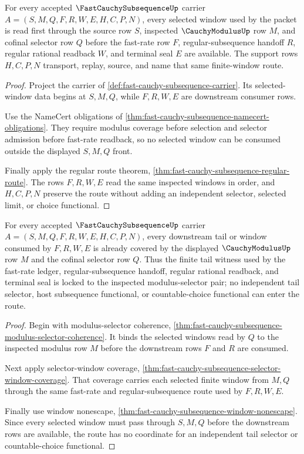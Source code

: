 \begin{theorem}
\label{thm:fast-cauchy-subsequence-window-nonescape}
For every accepted $\FastCauchySubsequenceUp$ carrier $A=(S,M,Q,F,R,W,E,H,C,P,N)$, every selected window used by the packet is read first through the source row $S$, inspected $\CauchyModulusUp$ row $M$, and cofinal selector row $Q$ before the fast-rate row $F$, regular-subsequence handoff $R$, regular rational readback $W$, and terminal seal $E$ are available. The support rows $H,C,P,N$ transport, replay, source, and name that same finite-window route.
\end{theorem}
\begin{proof}
Project the carrier of \autoref{def:fast-cauchy-subsequence-carrier}. Its selected-window data begins at $S,M,Q$, while $F,R,W,E$ are downstream consumer rows.

Use the NameCert obligations of \autoref{thm:fast-cauchy-subsequence-namecert-obligations}. They require modulus coverage before selection and selector admission before fast-rate readback, so no selected window can be consumed outside the displayed $S,M,Q$ front.

Finally apply the regular route theorem, \autoref{thm:fast-cauchy-subsequence-regular-route}. The rows $F,R,W,E$ read the same inspected windows in order, and $H,C,P,N$ preserve the route without adding an independent selector, selected limit, or choice functional.
\end{proof}

\begin{theorem}
\label{thm:fast-cauchy-subsequence-tail-modulus-lock}
For every accepted $\FastCauchySubsequenceUp$ carrier $A=(S,M,Q,F,R,W,E,H,C,P,N)$, every downstream tail or window consumed by $F,R,W,E$ is already covered by the displayed $\CauchyModulusUp$ row $M$ and the cofinal selector row $Q$. Thus the finite tail witness used by the fast-rate ledger, regular-subsequence handoff, regular rational readback, and terminal seal is locked to the inspected modulus-selector pair; no independent tail selector, host subsequence functional, or countable-choice functional can enter the route.
\end{theorem}
\begin{proof}
Begin with modulus-selector coherence, \autoref{thm:fast-cauchy-subsequence-modulus-selector-coherence}. It binds the selected windows read by $Q$ to the inspected modulus row $M$ before the downstream rows $F$ and $R$ are consumed.

Next apply selector-window coverage, \autoref{thm:fast-cauchy-subsequence-selector-window-coverage}. That coverage carries each selected finite window from $M,Q$ through the same fast-rate and regular-subsequence route used by $F,R,W,E$.

Finally use window nonescape, \autoref{thm:fast-cauchy-subsequence-window-nonescape}. Since every selected window must pass through $S,M,Q$ before the downstream rows are available, the route has no coordinate for an independent tail selector or countable-choice functional.
\end{proof}

